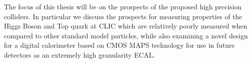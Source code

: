 The focus of this thesis will be on the prospects of the proposed high precision colliders. In particular we discuss the prospects for measuring properties of the Higgs Boson and Top quark at \ac{CLIC} which are relatively poorly measured when compared to other standard model particles, while also examining a novel design for a digital calorimeter based on \ac{CMOS} \ac{MAPS} technology for use in future detectors as an extremely high granularity \ac{ECAL}.  


 

